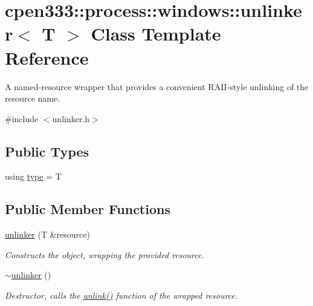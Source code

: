 \hypertarget{classcpen333_1_1process_1_1windows_1_1unlinker}{}\section{cpen333\+:\+:process\+:\+:windows\+:\+:unlinker$<$ T $>$ Class Template Reference}
\label{classcpen333_1_1process_1_1windows_1_1unlinker}


A named-\/resource wrapper that provides a convenient R\+A\+I\+I-\/style unlinking of the resource name.  




{\ttfamily \#include $<$unlinker.\+h$>$}

\subsection*{Public Types}
\begin{DoxyCompactItemize}
\item 
using \hyperlink{classcpen333_1_1process_1_1windows_1_1unlinker_a8fc5b25e2201aa44cf2323b46a98654b}{type} = T
\end{DoxyCompactItemize}
\subsection*{Public Member Functions}
\begin{DoxyCompactItemize}
\item 
\hyperlink{classcpen333_1_1process_1_1windows_1_1unlinker_aea3673b83a0810f21f537f503c8db271}{unlinker} (T \&resource)
\begin{DoxyCompactList}\small\item\em Constructs the object, wrapping the provided resource. \end{DoxyCompactList}\item 
\mbox{\label{classcpen333_1_1process_1_1windows_1_1unlinker_ab9039eb91dc37275a58e61e4adbc5765}} 
\hyperlink{classcpen333_1_1process_1_1windows_1_1unlinker_ab9039eb91dc37275a58e61e4adbc5765}{$\sim$unlinker} ()
\begin{DoxyCompactList}\small\item\em Destructor, calls the {\ttfamily \hyperlink{classcpen333_1_1process_1_1windows_1_1unlinker_a178646833bce209b221bd3262ab012bb}{unlink()}} function of the wrapped resource. \end{DoxyCompactList}\end{DoxyCompactItemize}
